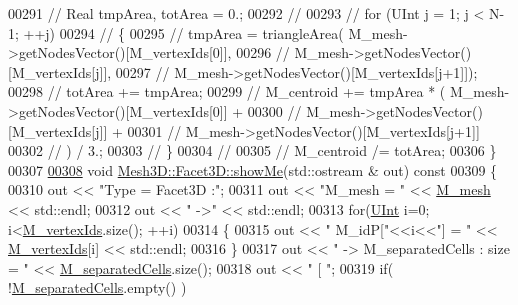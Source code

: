 \begin{DoxyCode}
00291 \textcolor{comment}{//    Real tmpArea, totArea = 0.;}
00292 \textcolor{comment}{//}
00293 \textcolor{comment}{//    for (UInt j = 1; j < N-1; ++j)}
00294 \textcolor{comment}{//    \{}
00295 \textcolor{comment}{//        tmpArea = triangleArea( M\_mesh->getNodesVector()[M\_vertexIds[0]],}
00296 \textcolor{comment}{//                                M\_mesh->getNodesVector()[M\_vertexIds[j]],}
00297 \textcolor{comment}{//                                M\_mesh->getNodesVector()[M\_vertexIds[j+1]]);}
00298 \textcolor{comment}{//        totArea += tmpArea;}
00299 \textcolor{comment}{//        M\_centroid += tmpArea * (   M\_mesh->getNodesVector()[M\_vertexIds[0]] +}
00300 \textcolor{comment}{//                                        M\_mesh->getNodesVector()[M\_vertexIds[j]] +}
00301 \textcolor{comment}{//                                        M\_mesh->getNodesVector()[M\_vertexIds[j+1]]}
00302 \textcolor{comment}{//                                    ) / 3.;}
00303 \textcolor{comment}{//    \}}
00304 \textcolor{comment}{//}
00305 \textcolor{comment}{//    M\_centroid /= totArea;}
00306 \}
00307 
\hypertarget{Mesh3D_8cpp_source.tex_l00308}{}\hyperlink{classFVCode3D_1_1Mesh3D_1_1Facet3D_a8ecdf3275bf4bd6ac921f691e3746383}{00308} \textcolor{keywordtype}{void} \hyperlink{classFVCode3D_1_1Mesh3D_1_1Facet3D_a8ecdf3275bf4bd6ac921f691e3746383}{Mesh3D::Facet3D::showMe}(std::ostream  & out)\textcolor{keyword}{ const}
00309 \textcolor{keyword}{}\{
00310     out << \textcolor{stringliteral}{"Type = Facet3D :"};
00311     out << \textcolor{stringliteral}{"M\_mesh = "} << \hyperlink{classFVCode3D_1_1Mesh3D_1_1Facet3D_adf8cf45ade4804389de18428aea4969d}{M\_mesh} << std::endl;
00312     out << \textcolor{stringliteral}{"  ->"} << std::endl;
00313     \textcolor{keywordflow}{for}(\hyperlink{namespaceFVCode3D_a4bf7e328c75d0fd504050d040ebe9eda}{UInt} i=0; i<\hyperlink{classFVCode3D_1_1Mesh3D_1_1Facet3D_ae763d815d2b4406b2f09d0ee5133392c}{M\_vertexIds}.size(); ++i)
00314     \{
00315         out << \textcolor{stringliteral}{"    M\_idP["}<<i<<\textcolor{stringliteral}{"] = "} << \hyperlink{classFVCode3D_1_1Mesh3D_1_1Facet3D_ae763d815d2b4406b2f09d0ee5133392c}{M\_vertexIds}[i] << std::endl;
00316     \}
00317     out << \textcolor{stringliteral}{"  -> M\_separatedCells : size = "} << \hyperlink{classFVCode3D_1_1Mesh3D_1_1Facet3D_a17706f1909c2479234a70c5e8bc440dd}{M\_separatedCells}.size();
00318     out << \textcolor{stringliteral}{"    [ "};
00319     \textcolor{keywordflow}{if}( !\hyperlink{classFVCode3D_1_1Mesh3D_1_1Facet3D_a17706f1909c2479234a70c5e8bc440dd}{M\_separatedCells}.empty() )

\end{DoxyCode}
